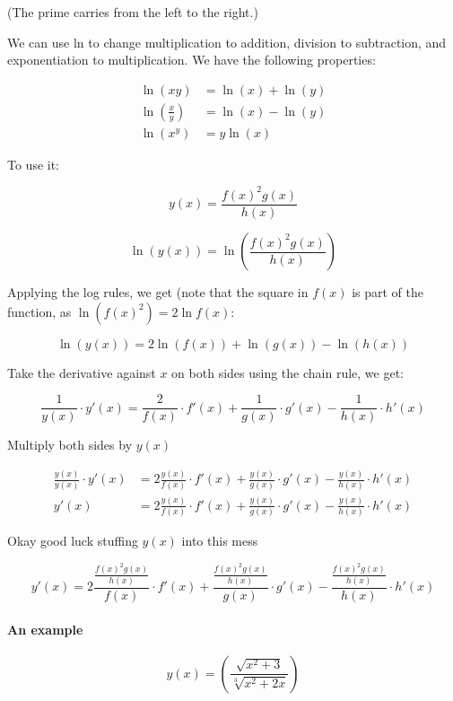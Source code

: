 \documentclass[
]{article}
\newcounter{example}
\begin{document}
(The prime carries from the left to the right.)

We can use ln to change multiplication to addition, division to
subtraction, and exponentiation to multiplication. We have the following
properties:

\begin{align*}
\ln\left( xy \right) &= \ln(x) + \ln(y)
 \\
\ln\left( \frac{x}{y} \right) &= \ln(x) - \ln(y)
 \\
\ln\left( x^{y} \right) &= y\ln(x)
\end{align*}


To use it:

$$y(x) = \frac{f(x)^{2}g(x)}{h(x)}
$$

$$\ln\left( y(x) \right) = \ln\left( \frac{f(x)^{2}g(x)}{h(x)} \right)$$

Applying the log rules, we get (note that the square in $f(x)$ is part
of the function, as $\ln\left( f(x)^{2} \right) = 2\ln{f(x)}$:

$$\ln\left( y(x) \right) = 2\ln\left( f(x) \right) + \ln\left( g(x) \right) - \ln\left( h(x) \right)$$

Take the derivative against $x$ on both sides using the chain rule, we
get:

$$\frac{1}{y(x)} \cdot y'(x) = \frac{2}{f(x)} \cdot f'(x) + \frac{1}{g(x)} \cdot g'(x) - \frac{1}{h(x)} \cdot h'(x)$$

Multiply both sides by $y(x)$

\begin{align*}
\frac{y(x)}{y(x)} \cdot y'(x) &= 2\frac{y(x)}{f(x)} \cdot f'(x) + \frac{y(x)}{g(x)} \cdot g'(x) - \frac{y(x)}{h(x)} \cdot h'(x)
 \\
y'(x) &= 2\frac{y(x)}{f(x)} \cdot f'(x) + \frac{y(x)}{g(x)} \cdot g'(x) - \frac{y(x)}{h(x)} \cdot h'(x)
\end{align*}


Okay good luck stuffing $y(x)$ into this mess

$$y'(x) = 2\frac{\frac{f(x)^{2}g(x)}{h(x)}}{f(x)} \cdot f'(x) + \frac{\frac{f(x)^{2}g(x)}{h(x)}}{g(x)} \cdot g'(x) - \frac{\frac{f(x)^{2}g(x)}{h(x)}}{h(x)} \cdot h'(x)$$


\paragraph{An example}

$$y(x) = \left( \frac{\sqrt{x^{2} + 3}}{\sqrt[3]{x^{2} + 2x}} \right)$$
\end{document}
